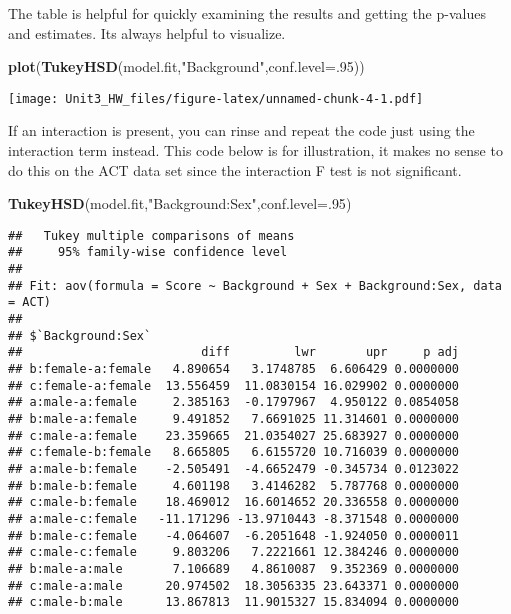 \documentclass[]{article}
\newenvironment{Shaded}{\begin{snugshade}}{\end{snugshade}}
\newcommand{\DataTypeTok}[1]{\textcolor[rgb]{0.13,0.29,0.53}{#1}}
\newcommand{\DecValTok}[1]{\textcolor[rgb]{0.00,0.00,0.81}{#1}}
\newcommand{\KeywordTok}[1]{\textcolor[rgb]{0.13,0.29,0.53}{\textbf{#1}}}
\newcommand{\NormalTok}[1]{#1}
\newcommand{\StringTok}[1]{\textcolor[rgb]{0.31,0.60,0.02}{#1}}
\begin{document}
The table is helpful for quickly examining the results and getting the
p-values and estimates. Its always helpful to visualize.

\begin{Shaded}
\begin{Highlighting}[]
\KeywordTok{plot}\NormalTok{(}\KeywordTok{TukeyHSD}\NormalTok{(model.fit,}\StringTok{"Background"}\NormalTok{,}\DataTypeTok{conf.level=}\NormalTok{.}\DecValTok{95}\NormalTok{))}
\end{Highlighting}
\end{Shaded}

\texttt{[image: Unit3\_HW\_files/figure-latex/unnamed-chunk-4-1.pdf]}

If an interaction is present, you can rinse and repeat the code just
using the interaction term instead. This code below is for illustration,
it makes no sense to do this on the ACT data set since the interaction F
test is not significant.

\begin{Shaded}
\begin{Highlighting}[]
\KeywordTok{TukeyHSD}\NormalTok{(model.fit,}\StringTok{"Background:Sex"}\NormalTok{,}\DataTypeTok{conf.level=}\NormalTok{.}\DecValTok{95}\NormalTok{)}
\end{Highlighting}
\end{Shaded}

\begin{verbatim}
##   Tukey multiple comparisons of means
##     95% family-wise confidence level
## 
## Fit: aov(formula = Score ~ Background + Sex + Background:Sex, data = ACT)
## 
## $`Background:Sex`
##                         diff         lwr       upr     p adj
## b:female-a:female   4.890654   3.1748785  6.606429 0.0000000
## c:female-a:female  13.556459  11.0830154 16.029902 0.0000000
## a:male-a:female     2.385163  -0.1797967  4.950122 0.0854058
## b:male-a:female     9.491852   7.6691025 11.314601 0.0000000
## c:male-a:female    23.359665  21.0354027 25.683927 0.0000000
## c:female-b:female   8.665805   6.6155720 10.716039 0.0000000
## a:male-b:female    -2.505491  -4.6652479 -0.345734 0.0123022
## b:male-b:female     4.601198   3.4146282  5.787768 0.0000000
## c:male-b:female    18.469012  16.6014652 20.336558 0.0000000
## a:male-c:female   -11.171296 -13.9710443 -8.371548 0.0000000
## b:male-c:female    -4.064607  -6.2051648 -1.924050 0.0000011
## c:male-c:female     9.803206   7.2221661 12.384246 0.0000000
## b:male-a:male       7.106689   4.8610087  9.352369 0.0000000
## c:male-a:male      20.974502  18.3056335 23.643371 0.0000000
## c:male-b:male      13.867813  11.9015327 15.834094 0.0000000
\end{verbatim}
\end{document}
